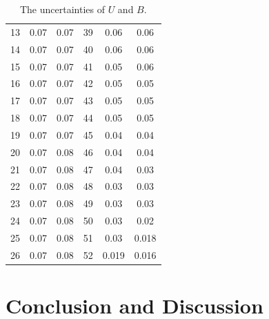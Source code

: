 \documentclass[a4paper]{article}
\begin{document}
\begin{table}[htbp]
\begin{tabular}{ccc||ccc}
		13 & 0.07                 & 0.07                            & 39 & 0.06                 & 0.06                            \\
		14 & 0.07                 & 0.07                            & 40 & 0.06                 & 0.06                            \\
		15 & 0.07                 & 0.07                            & 41 & 0.05                 & 0.06                            \\
		16 & 0.07                 & 0.07                            & 42 & 0.05                 & 0.05                            \\
		17 & 0.07                 & 0.07                            & 43 & 0.05                 & 0.05                            \\
		18 & 0.07                 & 0.07                            & 44 & 0.05                 & 0.05                            \\
		19 & 0.07                 & 0.07                            & 45 & 0.04                 & 0.04                            \\
		20 & 0.07                 & 0.08                            & 46 & 0.04                 & 0.04                            \\
		21 & 0.07                 & 0.08                            & 47 & 0.04                 & 0.03                            \\
		22 & 0.07                 & 0.08                            & 48 & 0.03                 & 0.03                            \\
		23 & 0.07                 & 0.08                            & 49 & 0.03                 & 0.03                            \\
		24 & 0.07                 & 0.08                            & 50 & 0.03                 & 0.02                            \\
		25 & 0.07                 & 0.08                            & 51 & 0.03                 & 0.018                           \\
		26 & 0.07                 & 0.08                            & 52 & 0.019                & 0.016                           \\
		\hline
	\end{tabular}
	\caption{The uncertainties of $U$ and $B$.}
	\label{table::uUB}
\end{table}

\section{Conclusion and Discussion}
\end{document}
